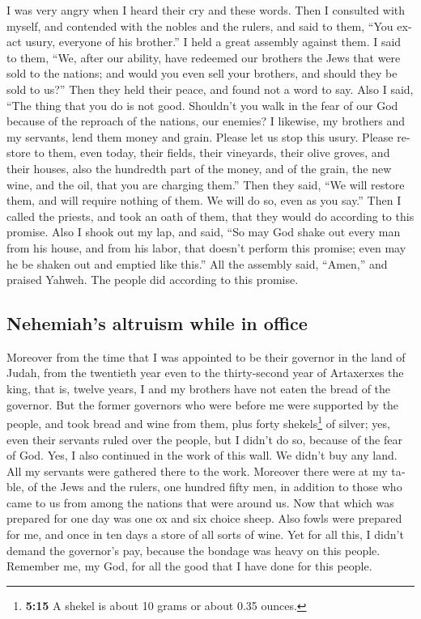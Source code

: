 \begin{paracol}{2}
\begin{otherlanguage}{english}
 I was very angry when I heard their cry and these words.
 Then I consulted with myself, and contended with the
nobles and the rulers, and said to them, ``You exact usury, everyone of
his brother.'' I held a great assembly against them.  I
said to them, ``We, after our ability, have redeemed our brothers the
Jews that were sold to the nations; and would you even sell your
brothers, and should they be sold to us?'' Then they held their peace,
and found not a word to say.  Also I said, ``The thing
that you do is not good. Shouldn't you walk in the fear of our God
because of the reproach of the nations, our enemies?  I
likewise, my brothers and my servants, lend them money and grain. Please
let us stop this usury.  Please restore to them, even
today, their fields, their vineyards, their olive groves, and their
houses, also the hundredth part of the money, and of the grain, the new
wine, and the oil, that you are charging them.''  Then
they said, ``We will restore them, and will require nothing of them. We
will do so, even as you say.'' Then I called the priests, and took an
oath of them, that they would do according to this promise.
 Also I shook out my lap, and said, ``So may God shake
out every man from his house, and from his labor, that doesn't perform
this promise; even may he be shaken out and emptied like this.'' All the
assembly said, ``Amen,'' and praised Yahweh. The people did according to
this promise.

\hypertarget{nehemiahs-altruism-while-in-office}{%
\subsection{Nehemiah's altruism while in
office}\label{nehemiahs-altruism-while-in-office}}

 Moreover from the time that I was appointed to be their
governor in the land of Judah, from the twentieth year even to the
thirty-second year of Artaxerxes the king, that is, twelve years, I and
my brothers have not eaten the bread of the governor. 
But the former governors who were before me were supported by the
people, and took bread and wine from them, plus forty shekels\footnote{\textbf{5:15}
  A shekel is about 10 grams or about 0.35 ounces.} of silver; yes, even
their servants ruled over the people, but I didn't do so, because of the
fear of God.  Yes, I also continued in the work of this
wall. We didn't buy any land. All my servants were gathered there to the
work.  Moreover there were at my table, of the Jews and
the rulers, one hundred fifty men, in addition to those who came to us
from among the nations that were around us.  Now that
which was prepared for one day was one ox and six choice sheep. Also
fowls were prepared for me, and once in ten days a store of all sorts of
wine. Yet for all this, I didn't demand the governor's pay, because the
bondage was heavy on this people.  Remember me, my God,
for all the good that I have done for this people.


\end{otherlanguage}
\end{paracol}
